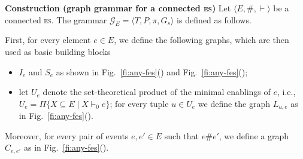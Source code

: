 \documentclass[conference]{IEEEtran}
\newcommand{\esabbr}{\textsc{es}}
\newcommand{\pmin}[1]{\ensuremath{U_{#1}}}
\begin{document}
\smallskip

\noindent
\textbf{Construction (graph grammar for a connected {\esabbr})} 
%
Let $\langle E, \#, \vdash \rangle$ be a 
connected {\esabbr}. 
%
The grammar $\mathcal{G}_{E} = \langle T, P, \pi, G_s \rangle$ is
defined as follows. 

First, for every element $e \in E$, we define the following graphs, which are
then used as basic building blocks
\begin{itemize}
\item $I_e$ and $S_e$ as shown in Fig.~\ref{fi:any-fes}() and Fig.~\ref{fi:any-fes}();

\item let $\pmin{e}$ denote the set-theoretical product of the minimal enablings of
  $e$, i.e., $\pmin{e} = \Pi \{ X \subseteq E \mid X \vdash_0 e
  \}$; for every tuple $u \in \pmin{e}$ we define the graph $L_{u,e}$ as in
  Fig.~\ref{fi:any-fes}().
\end{itemize}
Moreover, for every pair of events $e, e' \in E$ such that $e \# e'$,
we define a graph $C_{e,e'}$ as in
Fig.~\ref{fi:any-fes}().
\end{document}
